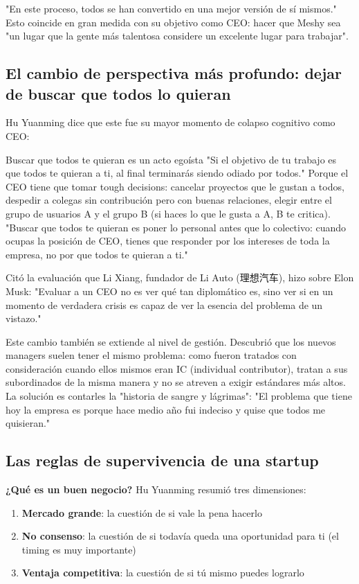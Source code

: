 "En este proceso, todos se han convertido en una mejor versión de sí mismos." Esto coincide en gran medida con su objetivo como CEO: hacer que Meshy sea "un lugar que la gente más talentosa considere un excelente lugar para trabajar".

\subsection{El cambio de perspectiva más profundo: dejar de buscar que todos lo quieran}

Hu Yuanming dice que este fue su mayor momento de colapso cognitivo como CEO:

\begin{warningbox}{Buscar que todos te quieran es un acto egoísta}
"Si el objetivo de tu trabajo es que todos te quieran a ti, al final terminarás siendo odiado por todos." Porque el CEO tiene que tomar tough decisions: cancelar proyectos que le gustan a todos, despedir a colegas sin contribución pero con buenas relaciones, elegir entre el grupo de usuarios A y el grupo B (si haces lo que le gusta a A, B te critica). "Buscar que todos te quieran es poner lo personal antes que lo colectivo: cuando ocupas la posición de CEO, tienes que responder por los intereses de toda la empresa, no por que todos te quieran a ti."
\end{warningbox}

Citó la evaluación que Li Xiang, fundador de Li Auto (理想汽车), hizo sobre Elon Musk: "Evaluar a un CEO no es ver qué tan diplomático es, sino ver si en un momento de verdadera crisis es capaz de ver la esencia del problema de un vistazo."

Este cambio también se extiende al nivel de gestión. Descubrió que los nuevos managers suelen tener el mismo problema: como fueron tratados con consideración cuando ellos mismos eran IC (individual contributor), tratan a sus subordinados de la misma manera y no se atreven a exigir estándares más altos. La solución es contarles la "historia de sangre y lágrimas": "El problema que tiene hoy la empresa es porque hace medio año fui indeciso y quise que todos me quisieran."

\subsection{Las reglas de supervivencia de una startup}

\textbf{¿Qué es un buen negocio?} Hu Yuanming resumió tres dimensiones:
\begin{enumerate}
\item \textbf{Mercado grande}: la cuestión de si vale la pena hacerlo
\item \textbf{No consenso}: la cuestión de si todavía queda una oportunidad para ti (el timing es muy importante)
\item \textbf{Ventaja competitiva}: la cuestión de si tú mismo puedes lograrlo
\end{enumerate}

